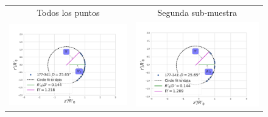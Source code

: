 \begin{figure}
    \centering
  \ContinuedFloat
  \captionsetup{list=off,format=cont}
  \begin{tabular}{cc}
    Todos los puntos & Segunda sub-muestra  \\
    \includegraphics[clip]{./Programs/LV-bowshocks-xyfancy-positionswill-177-341} & \includegraphics[clip]{./Programs/Multi-Fit/samp01/LV-bowshocks-xyfancy-positionssamp01-177-341} \\

\end{tabular}
\end{figure}
